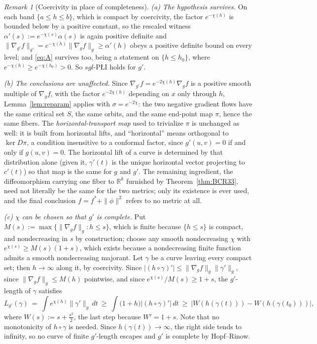 \documentclass[11pt]{article}
\theoremstyle{plain}
\theoremstyle{definition}
\theoremstyle{remark}
\newtheorem{rem}[thm]{Remark}
\newcommand{\R}{\mathbb{R}}
\begin{document}
\begin{rem}[Coercivity in place of completeness]
\emph{(a) The hypothesis survives.} On each band $\{a\le h\le b\}$, which is
compact by coercivity, the factor $e^{-\chi(h)}$ is bounded below by a positive
constant, so the rescaled witness $\alpha'(s) := e^{-\chi(s)}\alpha(s)$ is again
positive definite and
$\|\nabla_{g'} f\|_{g'} = e^{-\chi(h)}\|\nabla_g f\|_g \ge \alpha'(h)$ obeys a
positive definite bound on every level; and \eqref{eq:A} survives too, being a
statement on $\{h\le h_0\}$, where $e^{-\chi(h)}\ge e^{-\chi(h_0)}>0$. So
$sgl$-P\L{}I holds for $g'$.

\emph{(b) The conclusions are unaffected.} Since
$\nabla_{g'} f = e^{-2\chi(h)}\nabla_g f$ is a positive smooth multiple of
$\nabla_g f$, with the factor $e^{-2\chi(h)}$ depending on $x$ only through $h$,
Lemma~\ref{lem:reparam} applies with $\sigma = e^{-2\chi}$: the two negative
gradient flows have the same critical set $S$, the same orbits, and the same
end-point map $\pi$, hence the same fibers. The \emph{horizontal-transport
map} used to trivialize $\pi$ is unchanged as well: it is built from horizontal
lifts, and ``horizontal'' means orthogonal to $\ker D\pi$, a condition insensitive
to a conformal factor, since $g'(u,v)=0$ if and only if $g(u,v)=0$. The horizontal
lift of a curve is determined by that distribution alone (given it, $\gamma'(t)$
is the unique horizontal vector projecting to $c'(t)$) so that map is the same
for $g$ and $g'$. The remaining ingredient, the diffeomorphism carrying one fiber
to $\R^k$ furnished by Theorem~\ref{thm:BCR33}, need not literally be the same for
the two metrics; only its existence is ever used, and the final conclusion
$f = f^*+\|\phi\|^2$ refers to no metric at all.

\emph{(c) $\chi$ can be chosen so that $g'$ is complete.} Put
$M(s):=\max\{\|\nabla_g f\|_g : h\le s\}$, which is finite because $\{h\le s\}$ is
compact, and nondecreasing in $s$ by construction; choose any smooth
nondecreasing $\chi$ with $e^{\chi(s)}\ge M(s)(1+s)$, which exists because a
nondecreasing finite function admits a smooth nondecreasing majorant. Let $\gamma$
be a curve leaving every compact set; then $h\to\infty$ along it, by coercivity.
Since $|(h\circ\gamma)'|\le\|\nabla_g f\|_g\|\gamma'\|_g$, since
$\|\nabla_g f\|_g\le M(h)$ pointwise, and since $e^{\chi(s)}/M(s)\ge 1+s$, the
$g'$-length of $\gamma$ satisfies
\[
  L_{g'}(\gamma) \ =\ \int e^{\chi(h)}\|\gamma'\|_g\,dt
  \ \ge\ \int \bigl(1+h\bigr)\bigl|(h\circ\gamma)'\bigr|\,dt
  \ \ge\ \bigl|W(h(\gamma(t))) - W(h(\gamma(t_0)))\bigr| ,
\]
where $W(s) := s+\tfrac{s^2}{2}$, the last step because $W'=1+s$. Note that no monotonicity of $h\circ\gamma$ is
needed. Since $h(\gamma(t))\to\infty$, the right side tends to infinity, so no
curve of finite $g'$-length escapes and $g'$ is complete by Hopf--Rinow.
\end{rem}
\end{document}
